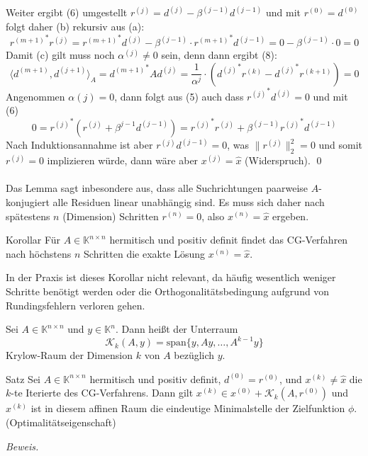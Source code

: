 \documentclass{article}
\begin{document}
Weiter ergibt (6) umgestellt $r^{(j)} = d^{(j)} - \beta^{(j-1)}d^{(j-1)}$ und mit $r^{(0)}=d^{(0)}$ folgt 
daher (b) rekursiv aus (a):
\[{r^{(m+1)}}^*r^{(j)} = {r^{(m+1)}}^*d^{(j)} - \beta^{(j-1)}\cdot {r^{(m+1)}}^*d^{(j-1)} = 
0 - \beta^{(j-1)}\cdot 0 = 0\]
Damit (c) gilt muss noch $\alpha^{(j)}\neq 0$ sein, denn dann ergibt (8):
\[\langle d^{(m+1)}, d^{(j+1)}\rangle_A = {d^{(m+1)}}^*Ad^{(j)} = 
\dfrac{1}{\alpha^{j}}\cdot\left({d^{(j)}}^*r^{(k)}-{d^{(j)}}^*r^{(k+1)}\right) = 0 \]
Angenommen $\alpha{(j)} = 0$, dann folgt aus (5) auch dass ${r^{(j)}}^*d^{(j)}=0$ und mit (6) 
\[0 = {r^{(j)}}^*\left(r^{(j)}+\beta^{j-1}d^{(j-1)}\right) = {r^{(j)}}^*r^{(j)}+\beta^{(j-1)}{r^{(j)}}^*d^{(j-1)}\]
Nach Induktionsannahme ist aber ${r^{(j)}}d^{(j-1)} = 0$, was $\|r^{(j)}\|_2^2 = 0$ und 
somit $r^{(j)} = 0$ implizieren würde, dann wäre aber $x^{(j)}=\hat{x}$ (Widerspruch). \qed \\ \\
Das Lemma sagt inbesondere aus, dass alle Suchrichtungen paarweise $A$-konjugiert alle Residuen linear unabhängig sind.
Es muss sich daher nach spätestens $n$ (Dimension) Schritten $r^{(n)}=0$, also $x^{(n)}=\hat{x}$ ergeben.
\begin{thmbox}{Korollar}
    Für $A\in\mathbb{K}^{n\times n}$ hermitisch und positiv definit findet das CG-Verfahren nach 
    höchstens $n$ Schritten die exakte Lösung $x^{(n)}=\hat{x}$.
\end{thmbox}
In der Praxis ist dieses Korollar nicht relevant, da häufig wesentlich weniger Schritte benötigt werden oder die 
Orthogonalitätsbedingung aufgrund von Rundingsfehlern verloren gehen.
\begin{defbox}
    Sei $A\in\mathbb{K}^{n\times n}$ und $y\in\mathbb{K}^n$. Dann heißt der Unterraum 
    \[\mathcal{K}_k(A,y)=\text{span}\{y,Ay,\dotsc,A^{k-1}y\}\] 
    Krylow-Raum der Dimension $k$ von $A$ bezüglich $y$.
\end{defbox}
\begin{thmbox}{Satz}
    Sei $A\in\mathbb{K}^{n\times n}$ hermitisch und positiv definit, $d^{(0)}=r^{(0)}$, und $x^{(k)}\neq \hat{x}$ 
    die $k$-te Iterierte des CG-Verfahrens. Dann gilt $x^{(k)}\in x^{(0)} + \mathcal{K}_k(A,r^{(0)})$ und $x^{(k)}$ ist 
    in diesem affinen Raum die eindeutige Minimalstelle der Zielfunktion $\phi$. (Optimalitätseigenschaft)
\end{thmbox}
\textit{Beweis.} 
\end{document}
